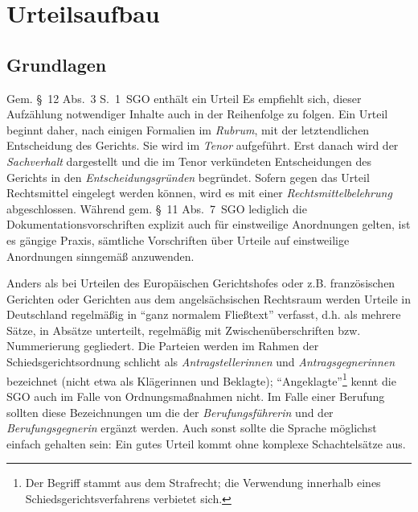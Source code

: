 
\chapter{Urteilsaufbau}
\label{Urteilsaufbau}

\section{Grundlagen}
\label{Urteilsaufbau:Grundlagen}
Gem. \S~12 Abs.~3 S.~1~SGO enthält ein Urteil 
Es empfiehlt sich, dieser Aufzählung notwendiger Inhalte auch in der Reihenfolge zu folgen.
Ein Urteil beginnt daher, nach einigen Formalien im \emph{Rubrum}, mit der letztendlichen Entscheidung des Gerichts.
Sie wird im \emph{Tenor} aufgeführt.
Erst danach wird der \emph{Sachverhalt} dargestellt und die im Tenor verkündeten Entscheidungen des Gerichts in den \emph{Entscheidungsgründen} begründet.
Sofern gegen das Urteil Rechtsmittel eingelegt werden können, wird es mit einer \emph{Rechtsmittelbelehrung} abgeschlossen.
Während gem. \S~11 Abs.~7~SGO lediglich die Dokumentationsvorschriften explizit auch für einstweilige Anordnungen gelten, ist es gängige Praxis, sämtliche Vorschriften über Urteile auf einstweilige Anordnungen sinngemäß anzuwenden.

Anders als bei Urteilen des Europäischen Gerichtshofes oder z.B. französischen Gerichten oder Gerichten aus dem angelsächsischen Rechtsraum werden Urteile in Deutschland regelmäßig in \enquote{ganz normalem Fließtext} verfasst, d.h. als mehrere Sätze, in Absätze unterteilt, regelmäßig mit Zwischenüberschriften bzw. Nummerierung gegliedert.
Die Parteien werden im Rahmen der Schiedsgerichtsordnung schlicht als \emph{Antragstellerinnen} und \emph{Antragsgegnerinnen} bezeichnet (nicht etwa als Klägerinnen und Beklagte); \enquote{Angeklagte}\footnote{Der Begriff stammt aus dem Strafrecht; die Verwendung innerhalb eines Schiedsgerichtsverfahrens verbietet sich.} kennt die SGO auch im Falle von Ordnungsmaßnahmen nicht.
Im Falle einer Berufung sollten diese Bezeichnungen um die der \emph{Berufungsführerin} und der \emph{Berufungsgegnerin} ergänzt werden.
Auch sonst sollte die Sprache möglichst einfach gehalten sein:
Ein gutes Urteil kommt ohne komplexe Schachtelsätze aus.

